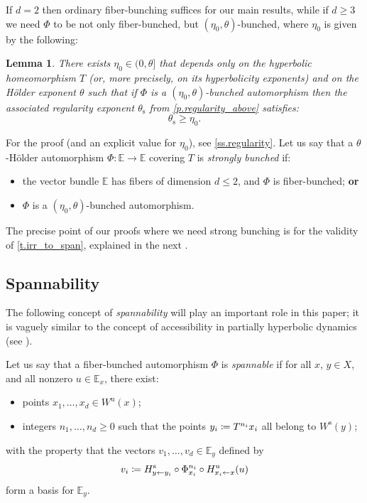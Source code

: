 \documentclass[10pt]{amsart}
\def\vcentcolon{\mathrel{\mathop\ordinarycolon}}
\providecommand\ordinarycolon{:}
\providecommand*\coloneqq{\vcentcolon\mathrel{\mkern-1.2mu}=}
\theoremstyle{plain}
\newtheorem{lemma}[theorem]{Lemma}
\theoremstyle{definition}
\newcommand{\EE}{\mathbb{E}}
\newcommand{\uu}{\mathrm{u}}
\renewcommand{\ss}{\mathrm{s}}
\begin{document}
If $d=2$ then ordinary fiber-bunching suffices for our main results, while if $d\ge 3$ we need $\Phi$ to be not only fiber-bunched, but $(\eta_0,\theta)$-bunched, where $\eta_0$ is given by the following:

\begin{lemma}\label{l.needed_strength}
There exists $\eta_0 \in (0,\theta]$ that depends only on the hyperbolic homeomorphism $T$ (or, more precisely, on its hyperbolicity exponents) and on the Hölder exponent $\theta$
such that if $\Phi$ is a $(\eta_0,\theta)$-bunched automorphism
then the associated regularity exponent $\theta_\ss$ from \cref{p.regularity_above} satisfies:
\[
\theta_\ss \ge \eta_0.
\]
\end{lemma}

For the proof (and an explicit value for $\eta_0$), see \cref{ss.regularity}. Let us say that a $\theta$-Hölder automorphism $\Phi \colon \EE \to \EE$ covering $T$ is \emph{strongly bunched} if:
\begin{itemize}
	\item the vector bundle $\EE$ has fibers of dimension $d \le 2$, and $\Phi$ is fiber-bunched; \textbf{or}
	\item $\Phi$ is a $(\eta_0,\theta)$-bunched automorphism.
\end{itemize}

The precise point of our proofs where we need strong bunching is for the validity of \cref{t.irr_to_span}, explained in the next .

\subsection{Spannability} \label{ss.span}

The following concept of \emph{spannability} will play an important role in this paper; it is vaguely similar to the concept of accessibility in partially hyperbolic dynamics (see \eg \cite[\S8.1]{Pesin_book}).

Let us say that a fiber-bunched automorphism $\Phi$ is \emph{spannable} if for all $x$, $y \in X$, and all nonzero $u \in \EE_x$, there exist:
\begin{itemize}
	\item points $x_1, \dots, x_d \in W^\uu(x)$;
	\item integers $n_1, \dots, n_d \ge 0$ such that the points $y_i \coloneqq T^{n_i} x_i$ all belong to $W^\ss(y)$;
\end{itemize}
with the property that the vectors $v_1, \dots, v_d \in \EE_y$ defined by
\begin{equation}\label{e.spanners}
v_i \coloneqq H^\ss_{y \gets y_i} \circ \Phi^{n_i}_{x_i} \circ H^\uu_{x_i \gets x} (u)
\end{equation}
form a basis for $\EE_y$.
\end{document}
